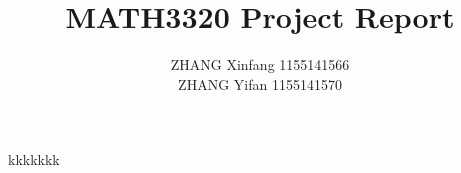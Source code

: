 \documentclass[12pt]{article}
\title{MATH3320 Project Report}
\author{ZHANG Xinfang 1155141566\\ZHANG Yifan 1155141570}
\date{\displaydate{date}}
\begin{document}
\maketitle
kkkkkkk
\end{document}

